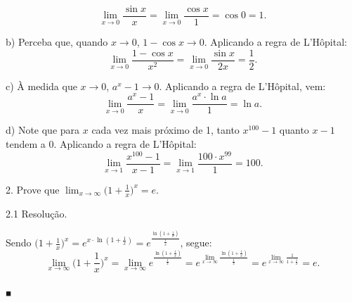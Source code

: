 \documentclass{article}
\begin{document}
{\begin{newpage}
\begin{equation*} \displaystyle{\lim_{x\to 0} \frac{\sin{x}}{x} = \lim_{x\to 0} \frac{\cos{x}}{1} = \cos{0} = 1}.\end{equation*}
\par
\vspace{0.3cm}
b) Perceba que, quando $x\rightarrow 0$, $1 - \cos{x}\rightarrow 0$. Aplicando a regra de L'Hôpital:
\begin{equation*} \displaystyle{\lim_{x\to 0} \frac{1 - \cos{x}}{x^2} = \lim_{x\to 0} \frac{\sin{x}}{2x} = \frac{1}{2}}.\end{equation*}
\par
\vspace{0.3cm}
c) À medida que $x\rightarrow 0$, $a^x - 1\rightarrow 0$. Aplicando a regra de L'Hôpital, vem:
\begin{equation*}\displaystyle{\lim_{x\to 0} \frac{a^x - 1}{x} = \lim_{x\to 0} \frac{a^{x}\cdot\ln{a}}{1} = \ln{a}}.\end{equation*}
\par
\vspace{0.3cm}
d) Note que para $x$ cada vez mais próximo de 1, tanto $x^{100} - 1$ quanto $x-1$ tendem a 0. Aplicando a regra de L'Hôpital:
\begin{equation*} \displaystyle{\lim_{x\to 1} \frac{x^{100} - 1}{x-1} = \lim_{x\to 1} \frac{100\cdot x^{99}}{1} = 100}.\end{equation*}
\par
\vspace{0.3cm}
\begin{flushleft}
2. Prove que $\displaystyle{\lim_{x\to \infty }\Big(1 + \frac{1}{x} \Big)^x} = e$.
\end{flushleft}
\par
\vspace{0.3cm}
\begin{flushleft}
2.1 Resolução.
\end{flushleft}
\par Sendo $\displaystyle{\Big(1 + \frac{1}{x}\Big)^x = e^{x\cdot\ln{(1 + \frac{1}{x})}} = e^{\frac{\ln{(1+\frac{1}{x})}}{\frac{1}{x}}}}$, segue:
\begin{equation*}  \displaystyle{\lim_{x\to \infty }\Big(1 + \frac{1}{x} \Big)^x = \lim_{x\to\infty } e^{\frac{\ln{(1+\frac{1}{x})}}{\frac{1}{x}}} = e^{\lim_{x\to\infty } \frac{\ln{(1 + \frac{1}{x})}}{\frac{1}{x}}} = e^{\lim_{x\to\infty }\frac{1}{1 + \frac{1}{x}}} = e}.\end{equation*} \begin{flushright} $_{\blacksquare }$ \end{flushright}
\par
\vspace{0.3cm}

\end{newpage}}
\end{document}
